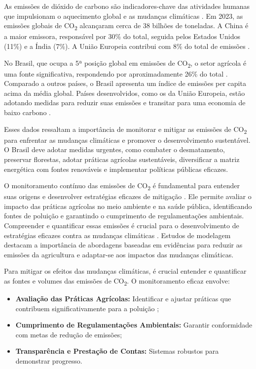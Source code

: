 As emissões de dióxido de carbono são indicadores-chave das atividades humanas que impulsionam o aquecimento global e as mudanças climáticas \cite{ipcc2021ar6}. Em 2023, as emissões globais de CO\textsubscript{2} alcançaram cerca de 38 bilhões de toneladas. A China é a maior emissora, responsável por 30\% do total, seguida pelos Estados Unidos (11\%) e a Índia (7\%). A União Europeia contribui com 8\% do total de emissões \cite{worldbank2022carbon}.

No Brasil, que ocupa a 5ª posição global em emissões de CO\textsubscript{2}, o setor agrícola é uma fonte significativa, respondendo por aproximadamente 26\% do total \cite{ipcc2014afolu}. Comparado a outros países, o Brasil apresenta um índice de emissões per capita acima da média global. Países desenvolvidos, como os da União Europeia, estão adotando medidas para reduzir suas emissões e transitar para uma economia de baixo carbono \cite{ipcc2021ar6}.

Esses dados ressaltam a importância de monitorar e mitigar as emissões de CO\textsubscript{2} para enfrentar as mudanças climáticas e promover o desenvolvimento sustentável. O Brasil deve adotar medidas urgentes, como combater o desmatamento, preservar florestas, adotar práticas agrícolas sustentáveis, diversificar a matriz energética com fontes renováveis e implementar políticas públicas eficazes. \cite{govbr2024}

O monitoramento contínuo das emissões de CO\textsubscript{2} é fundamental para entender suas origens e desenvolver estratégias eficazes de mitigação \cite{ipcc2019land}. Ele permite avaliar o impacto das práticas agrícolas no meio ambiente e na saúde pública, identificando fontes de poluição e garantindo o cumprimento de regulamentações ambientais. Compreender e quantificar essas emissões é crucial para o desenvolvimento de estratégias eficazes contra as mudanças climáticas \cite{ipcc2014afolu}. Estudos de modelagem \cite{ipcc2021ar6} destacam a importância de abordagens baseadas em evidências para reduzir as emissões da agricultura e adaptar-se aos impactos das mudanças climáticas.

Para mitigar os efeitos das mudanças climáticas, é crucial entender e quantificar as fontes e volumes das emissões de CO\textsubscript{2}. O monitoramento eficaz envolve:

\begin{itemize}
    \item \textbf{Avaliação das Práticas Agrícolas:} Identificar e ajustar práticas que contribuem significativamente para a poluição ;
    \item \textbf{Cumprimento de Regulamentações Ambientais:} Garantir conformidade com metas de redução de emissões;
    \item \textbf{Transparência e Prestação de Contas:} Sistemas robustos para demonstrar progresso.
\end{itemize}

